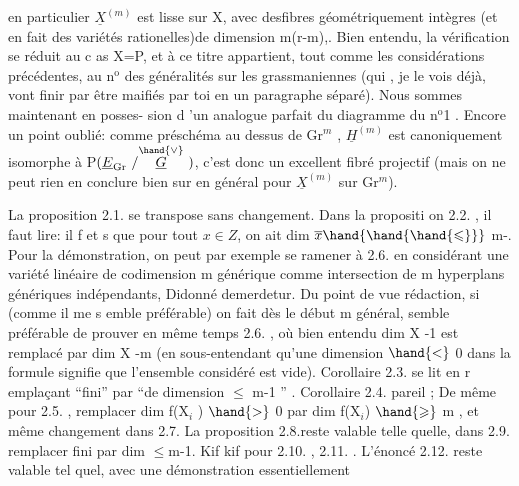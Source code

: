 
en particulier $\underline{X}^{(m)}$ est lisse sur X, avec des\hand{/}fibres géométriquement
intègres (et en fait des variétés rationelles)de dimension m(r-m),. Bien entendu, la
vérification se réduit au c as X=P, et à ce titre appartient, tout
\placedmargin{|}comme les considérations précédentes, au n$^{\text{o}}$ des généralités sur les
grassmaniennes (qui , je le vois déjà, vont finir par être maifiés
par toi en un paragraphe séparé). Nous sommes maintenant en posses-%
sion d 'un analogue parfait du diagramme du n$^{\text{o}}$1 . Encore un point
oublié: comme préschéma au dessus de Gr$^{m}$ , $\underline{H}^{(m)}$ est canoniquement
isomorphe à P$(\underline{E}_{\mathrm{Gr}}\ /\overset{\hand{\vee}}{\underline{G}}\ )$, c'est donc un excellent fibré projectif
(mais on ne peut rien en conclure bien sur en général pour $\underline{X}^{(m)}$ sur
Gr$^{m}$).

La proposition 2.1. se transpose sans changement. Dans la
propositi on 2.2. , il faut lire: il f et s que pour tout $x \in Z$, on
ait  dim $\overline{x} \hand{\hand{\hand{\leqslant}}}$ m-. Pour la démonstration, on peut par exemple
se ramener à 2.6. en considérant une  variété linéaire de
codimension m générique comme intersection de m hyperplans génériques
indépendants, Didonné demerdetur. Du point de vue rédaction, si
(comme il me s emble préférable) on fait dès le début m général, 
semble préférable de prouver en même temps 2.6. , où bien entendu
dim X -1 est remplacé par dim X -m (en sous-entendant qu'une dimension
$\hand{<}$ 0 dans la formule signifie que l'ensemble considéré est vide).
Corollaire 2.3. se lit en r emplaçant ``fini'' par ``de dimension $\leqslant$ 
m-1 '' . Corollaire 2.4. pareil ; De même pour 2.5. , remplacer
dim f(X$_{i}$ ) $\hand{>}$ 0 par dim f(X$_{i}$) $\hand{\geqslant}$ m , et même changement dans 2.7.
La proposition 2.8.reste valable telle quelle, dans 2.9. remplacer
fini par dim $\leqslant$m-1. Kif kif pour 2.10. , 2.11. . L'énoncé
2.12. reste valable tel quel, avec une démonstration essentiellement


